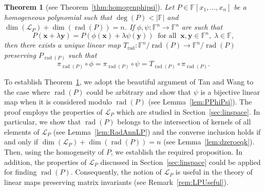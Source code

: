 \documentclass{elsarticle}
\DeclareMathOperator{\rad}{rad}
\def\F{{\mathbb F}}
\newtheorem{theorem}{Theorem}[section]
\theoremstyle{definition}
\numberwithin{equation}{section}
\begin{document}
\begin{theorem}[see Theorem~\ref{thm:homogenphipsi}]\label{thm:homogenphipsiintro}Let $P \in \F[x_1,\ldots, x_n]$ be a homogeneous polynomial such that $\deg (P) < |\F|$ and $\dim (\mathcal L_P) + \dim (\rad(P)) = n$.  If  $\phi, \psi \colon \F^n \to \F^n$ are such that
\begin{equation}\label{thm:homogenphipsiintro:eqq1}
P(\mathbf{x} + \lambda \mathbf{y}) = P(\phi(\mathbf{x}) + \lambda \psi(\mathbf{y}))\;\;\mbox{for all}\;\;\mathbf{x},\mathbf{y} \in \mathbb \F^n,\; \lambda \in \F,
\end{equation}
then there exists a unique linear map $T_{\rad} \colon \F^n/\rad(P) \to \F^n/\rad(P)$ preserving $P_{\rad(P)}$ such that
\begin{equation*}%
\pi_{\rad(P)} \circ \phi = \pi_{\rad(P)} \circ \psi = T_{\rad(P)} \circ \pi_{\rad(P)}. 
\end{equation*}
\end{theorem} 

To establish Theorem~\ref{thm:homogenphipsiintro}, we adopt the beautiful argument of Tan and Wang to the case where $\rad(P)$ could be arbitrary and show that $\psi$ is a bijective linear map when it is considered modulo $\rad(P)$ (see Lemma~\ref{lem:PPhiPsi}). The proof employs the properties of $\mathcal L_P$ which are studied in Section~\ref{sec:linspace}. In particular, we show that $\rad(P)$ belongs to the intersection of kernels of all elements of $\mathcal L_P$ (see Lemma~\ref{lem:RadAnnLP}) and the converse inclusion holds if and only if $\dim (\mathcal L_P) + \dim (\rad(P)) = n$ (see Lemma~\ref{lem:dzeroeqk}). Then, using the homogeneity of $P$, we establish the required proposition. In addition, the properties of $\mathcal L_P$ discussed in Section~\ref{sec:linspace} could be applied for finding $\rad(P)$. Consequently, the notion of $\mathcal L_P$ is useful in the theory of linear maps preserving matrix invariants (see Remark~\ref{rem:LPUseful}).

%
%
%
\end{document}
